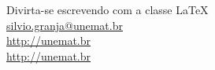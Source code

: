     Divirta-se escrevendo com a classe  \LaTeX\   \hspace{5pt}\faHandSpock[regular] \\%
    \faEnvelope[regular]\hspace{7pt}\href{mailto://silvio.granja@unemat.br}{silvio.granja@unemat.br}\\
    \faUniversity\hspace{7pt}\href{http://unemat.br}{http://unemat.br}\\
    \faMapMarked\hspace{7pt}\href{https://maps.app.goo.gl/d1oovfssBBWaKnRk6}{http://unemat.br}


